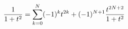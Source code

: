 \documentclass[preview]{standalone}
\begin{document}
\begin{align*}
\special{dvisvgm:raw <g id='unique000'>}\frac1{1+t^2}=\sum_{k=0}^N(-1)^kt^{2k}+(-1)^{N+1}\frac{t^{2N+2}}{1+t^2}\special{dvisvgm:raw </g>}
\end{align*}
\end{document}
